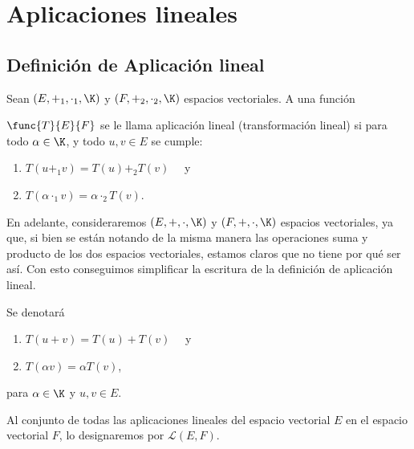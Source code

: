 \documentclass[compacto,10pt]{pubciencias-notas}
\begin{document}
\encabezado
\vspace*{-8mm}

\setcounter{section}{5}
\section{Aplicaciones lineales}

\subsection{Definición de Aplicación lineal}
\setcounter{defi}{0}
\begin{defi}
    Sean $(E,+_1,\cdot_1,\K)$ y $(F,+_2,\cdot_2,\K)$ espacios vectoriales. A una función
    
    \noindent $\func{T}{E}{F}$ se le llama aplicación lineal (transformación lineal) si para todo $\alpha \in \K$, y todo $u,v \in E$ se cumple:
    \begin{enumerate}
    \item 
        $T(u +_1 v) = T(u) +_2 T(v)\quad$ y
    \item 
        $T(\alpha \cdot_1 v ) = \alpha \cdot_2 T(v)$.
    \end{enumerate}
\end{defi}

\begin{obs}
En adelante, consideraremos $(E,+,\cdot,\K)$ y $(F,+,\cdot,\K)$ espacios vectoriales, ya que, si bien se están notando de la misma manera las operaciones suma y producto de los dos espacios vectoriales, estamos claros que no tiene por qué ser así. Con esto conseguimos simplificar la escritura de la definición de aplicación lineal.
\end{obs}

\begin{advertencia}
    Se denotará
    \begin{enumerate}
    \item 
        $T(u + v) = T(u) + T(v)\quad$ y
    \item 
        $T(\alpha v ) = \alpha T(v)$,
    \end{enumerate}
    para $\alpha \in \K$ y $u,v \in E$.
\end{advertencia}

\begin{obs}
    Al conjunto de todas las aplicaciones lineales del espacio vectorial $E$ en el espacio vectorial $F$, lo designaremos por $\mathscr{L}(E,F)$.
\end{obs}
\end{document}
